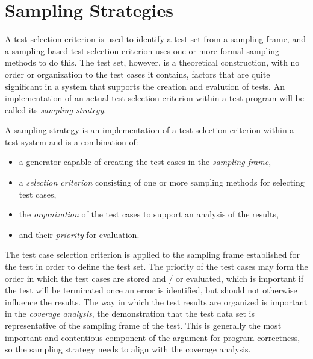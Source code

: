 \section{Sampling Strategies}
A test selection criterion is used to identify a test set from a sampling frame,
and a sampling based test selection criterion
uses one or more formal sampling methods to do this.
The test set, however, is a theoretical construction,
with no order or organization to the test cases it contains,
factors that are quite significant in a system that supports the creation and evalution of tests.
An implementation of an actual test selection criterion within a test program
will be called its \emph{sampling strategy}.

\begin{df}
A sampling strategy is an implementation of a test selection criterion within a test system
and is a combination of:

\begin{itemize}
\item a generator capable of creating the test cases in the \emph{sampling frame},
\item a \emph{selection criterion} consisting of one or more sampling methods for selecting test cases,
\item the \emph{organization} of the test cases to support an analysis of the results,
\item and their \emph{priority} for evaluation.
\end{itemize}
\end{df}

\noindent
The test case selection criterion is
applied to the sampling frame established for the test
in order to define the test set.
The priority of the test cases may form the order 
in which the test cases are stored and / or evaluated,
which is important if the test will be terminated once an error is identified,
but should not otherwise influence the results.
The way in which the test results are organized
is important in the \emph{coverage analysis},
the demonstration that the test data set is representative of
the sampling frame of the test.
This is generally the most important and contentious component
of the argument for program correctness,
so the sampling strategy needs to align with the coverage analysis.






